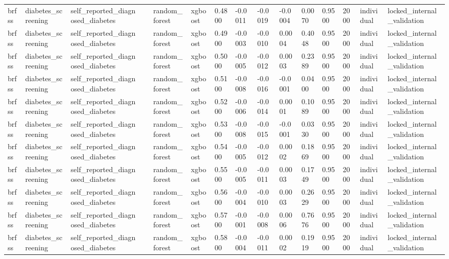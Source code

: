 \begin{tabular}{lllllllllllllll}
brfss & diabetes\_screening & self\_reported\_diagnosed\_diabetes &  & random\_forest & xgboost & 0.4800 & -0.0011 & -0.0019 & -0.0004 & 0.0070 & 0.9500 & 2000 & individual & locked\_internal\_validation \\
brfss & diabetes\_screening & self\_reported\_diagnosed\_diabetes &  & random\_forest & xgboost & 0.4900 & -0.0003 & -0.0010 & 0.0004 & 0.4048 & 0.9500 & 2000 & individual & locked\_internal\_validation \\
brfss & diabetes\_screening & self\_reported\_diagnosed\_diabetes &  & random\_forest & xgboost & 0.5000 & -0.0005 & -0.0012 & 0.0003 & 0.2389 & 0.9500 & 2000 & individual & locked\_internal\_validation \\
brfss & diabetes\_screening & self\_reported\_diagnosed\_diabetes &  & random\_forest & xgboost & 0.5100 & -0.0008 & -0.0016 & -0.0001 & 0.0400 & 0.9500 & 2000 & individual & locked\_internal\_validation \\
brfss & diabetes\_screening & self\_reported\_diagnosed\_diabetes &  & random\_forest & xgboost & 0.5200 & -0.0006 & -0.0014 & 0.0001 & 0.1089 & 0.9500 & 2000 & individual & locked\_internal\_validation \\
brfss & diabetes\_screening & self\_reported\_diagnosed\_diabetes &  & random\_forest & xgboost & 0.5300 & -0.0008 & -0.0015 & -0.0001 & 0.0330 & 0.9500 & 2000 & individual & locked\_internal\_validation \\
brfss & diabetes\_screening & self\_reported\_diagnosed\_diabetes &  & random\_forest & xgboost & 0.5400 & -0.0005 & -0.0012 & 0.0002 & 0.1869 & 0.9500 & 2000 & individual & locked\_internal\_validation \\
brfss & diabetes\_screening & self\_reported\_diagnosed\_diabetes &  & random\_forest & xgboost & 0.5500 & -0.0005 & -0.0011 & 0.0003 & 0.1749 & 0.9500 & 2000 & individual & locked\_internal\_validation \\
brfss & diabetes\_screening & self\_reported\_diagnosed\_diabetes &  & random\_forest & xgboost & 0.5600 & -0.0004 & -0.0010 & 0.0003 & 0.2629 & 0.9500 & 2000 & individual & locked\_internal\_validation \\
brfss & diabetes\_screening & self\_reported\_diagnosed\_diabetes &  & random\_forest & xgboost & 0.5700 & -0.0001 & -0.0008 & 0.0006 & 0.7676 & 0.9500 & 2000 & individual & locked\_internal\_validation \\
brfss & diabetes\_screening & self\_reported\_diagnosed\_diabetes &  & random\_forest & xgboost & 0.5800 & -0.0004 & -0.0011 & 0.0002 & 0.1919 & 0.9500 & 2000 & individual & locked\_internal\_validation \\

\end{tabular}

